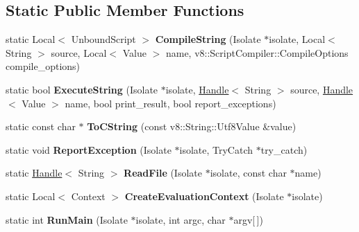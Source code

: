 \subsection*{Static Public Member Functions}
\begin{DoxyCompactItemize}
\item 
\hypertarget{classv8_1_1_shell_a064cebc7abc3f853d9878f310e48bd61}{}static Local$<$ Unbound\+Script $>$ {\bfseries Compile\+String} (Isolate $\ast$isolate, Local$<$ String $>$ source, Local$<$ Value $>$ name, v8\+::\+Script\+Compiler\+::\+Compile\+Options compile\+\_\+options)\label{classv8_1_1_shell_a064cebc7abc3f853d9878f310e48bd61}

\item 
\hypertarget{classv8_1_1_shell_ae270c42c50bf13c2ea7d679391405d61}{}static bool {\bfseries Execute\+String} (Isolate $\ast$isolate, \hyperlink{classv8_1_1_handle}{Handle}$<$ String $>$ source, \hyperlink{classv8_1_1_handle}{Handle}$<$ Value $>$ name, bool print\+\_\+result, bool report\+\_\+exceptions)\label{classv8_1_1_shell_ae270c42c50bf13c2ea7d679391405d61}

\item 
\hypertarget{classv8_1_1_shell_a4be20a6785bf3b70e8cb546afbae5282}{}static const char $\ast$ {\bfseries To\+C\+String} (const v8\+::\+String\+::\+Utf8\+Value \&value)\label{classv8_1_1_shell_a4be20a6785bf3b70e8cb546afbae5282}

\item 
\hypertarget{classv8_1_1_shell_a45ffe976e0fcd45629b6ff5f03e80943}{}static void {\bfseries Report\+Exception} (Isolate $\ast$isolate, Try\+Catch $\ast$try\+\_\+catch)\label{classv8_1_1_shell_a45ffe976e0fcd45629b6ff5f03e80943}

\item 
\hypertarget{classv8_1_1_shell_adae787adf93be590c4ad12dbcd6c7cc0}{}static \hyperlink{classv8_1_1_handle}{Handle}$<$ String $>$ {\bfseries Read\+File} (Isolate $\ast$isolate, const char $\ast$name)\label{classv8_1_1_shell_adae787adf93be590c4ad12dbcd6c7cc0}

\item 
\hypertarget{classv8_1_1_shell_a7e4313b0046d027e73a03e6665821493}{}static Local$<$ Context $>$ {\bfseries Create\+Evaluation\+Context} (Isolate $\ast$isolate)\label{classv8_1_1_shell_a7e4313b0046d027e73a03e6665821493}

\item 
\hypertarget{classv8_1_1_shell_a94fa1f60727021b79cb639bfc8923b71}{}static int {\bfseries Run\+Main} (Isolate $\ast$isolate, int argc, char $\ast$argv\mbox{[}$\,$\mbox{]})\label{classv8_1_1_shell_a94fa1f60727021b79cb639bfc8923b71}


\end{DoxyCompactItemize}
